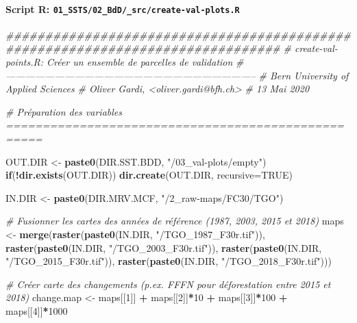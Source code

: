 \documentclass[a4paper, notitlepage, 12pt, krantz2]{krantz}
\newenvironment{Shaded}{\begin{snugshade}}{\end{snugshade}}
\newcommand{\CommentTok}[1]{\textcolor[rgb]{0.56,0.35,0.01}{\textit{#1}}}
\newcommand{\ControlFlowTok}[1]{\textcolor[rgb]{0.13,0.29,0.53}{\textbf{#1}}}
\newcommand{\DataTypeTok}[1]{\textcolor[rgb]{0.13,0.29,0.53}{#1}}
\newcommand{\DecValTok}[1]{\textcolor[rgb]{0.00,0.00,0.81}{#1}}
\newcommand{\KeywordTok}[1]{\textcolor[rgb]{0.13,0.29,0.53}{\textbf{#1}}}
\newcommand{\NormalTok}[1]{#1}
\newcommand{\OperatorTok}[1]{\textcolor[rgb]{0.81,0.36,0.00}{\textbf{#1}}}
\newcommand{\OtherTok}[1]{\textcolor[rgb]{0.56,0.35,0.01}{#1}}
\newcommand{\StringTok}[1]{\textcolor[rgb]{0.31,0.60,0.02}{#1}}
\let\oldparagraph\paragraph
\renewcommand{\paragraph}[1]{\oldparagraph{#1}\mbox{}}
\begin{document}
\hypertarget{script-r-01_ssts02_bdd_srccreate-val-plots.r}{%
\paragraph{\texorpdfstring{Script R: \texttt{01\_SSTS/02\_BdD/\_src/create-val-plots.R}}{Script R: 01\_SSTS/02\_BdD/\_src/create-val-plots.R}}\label{script-r-01_ssts02_bdd_srccreate-val-plots.r}}

\begin{Shaded}
\begin{Highlighting}[]
\CommentTok{###############################################################################}
\CommentTok{# create-val-points.R: Créer un ensemble de parcelles de validation}
\CommentTok{# -----------------------------------------------------------------------------}
\CommentTok{# Bern University of Applied Sciences}
\CommentTok{# Oliver Gardi, <oliver.gardi@bfh.ch>}
\CommentTok{# 13 Mai 2020}

\CommentTok{# Préparation des variables ===================================================}

\NormalTok{OUT.DIR <-}\StringTok{ }\KeywordTok{paste0}\NormalTok{(DIR.SST.BDD, }\StringTok{"/03_val-plots/empty"}\NormalTok{)}
\ControlFlowTok{if}\NormalTok{(}\OperatorTok{!}\KeywordTok{dir.exists}\NormalTok{(OUT.DIR)) }\KeywordTok{dir.create}\NormalTok{(OUT.DIR, }\DataTypeTok{recursive=}\OtherTok{TRUE}\NormalTok{)}

\NormalTok{IN.DIR <-}\StringTok{ }\KeywordTok{paste0}\NormalTok{(DIR.MRV.MCF, }\StringTok{"/2_raw-maps/FC30/TGO"}\NormalTok{)}

\CommentTok{# Fusionner les cartes des années de référence (1987, 2003, 2015 et 2018)}
\NormalTok{maps <-}\StringTok{ }\KeywordTok{merge}\NormalTok{(}\KeywordTok{raster}\NormalTok{(}\KeywordTok{paste0}\NormalTok{(IN.DIR, }\StringTok{"/TGO_1987_F30r.tif"}\NormalTok{)),}
              \KeywordTok{raster}\NormalTok{(}\KeywordTok{paste0}\NormalTok{(IN.DIR, }\StringTok{"/TGO_2003_F30r.tif"}\NormalTok{)),}
              \KeywordTok{raster}\NormalTok{(}\KeywordTok{paste0}\NormalTok{(IN.DIR, }\StringTok{"/TGO_2015_F30r.tif"}\NormalTok{)),}
              \KeywordTok{raster}\NormalTok{(}\KeywordTok{paste0}\NormalTok{(IN.DIR, }\StringTok{"/TGO_2018_F30r.tif"}\NormalTok{)))}

\CommentTok{# Créer carte des changements (p.ex. FFFN pour déforestation entre 2015 et 2018)}
\NormalTok{change.map <-}\StringTok{ }\NormalTok{maps[[}\DecValTok{1}\NormalTok{]] }\OperatorTok{+}\StringTok{ }\NormalTok{maps[[}\DecValTok{2}\NormalTok{]]}\OperatorTok{*}\DecValTok{10} \OperatorTok{+}\StringTok{ }\NormalTok{maps[[}\DecValTok{3}\NormalTok{]]}\OperatorTok{*}\DecValTok{100} \OperatorTok{+}\StringTok{ }\NormalTok{maps[[}\DecValTok{4}\NormalTok{]]}\OperatorTok{*}\DecValTok{1000}


\end{Highlighting}
\end{Shaded}
\end{document}
